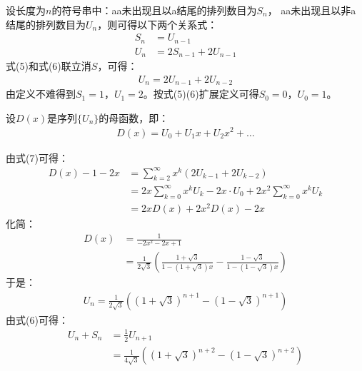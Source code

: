 \begin{solution}
    设长度为$n$的符号串中：aa未出现且以a结尾的排列数目为$S_n$，
    aa未出现且以非a结尾的排列数目为$U_n$，则可得以下两个关系式：
    \begin{align}
        S_n &= U_{n-1}\\
        U_n &= 2S_{n-1} + 2U_{n-1}
    \end{align}
    式(5)和式(6)联立消$S$，可得：
    \begin{align}
        U_{n}=2U_{n-1}+2U_{n-2}
    \end{align}
    由定义不难得到$S_1=1$，$U_1=2$。按式(5)(6)扩展定义可得$S_0=0$，$U_0=1$。

    设$D(x)$是序列$\{U_n\}$的母函数，即：
    \begin{align*}
        D(x)=U_0+U_1x+U_2x^2+\ldots
    \end{align*}

    由式(7)可得：
    \begin{align*}
        D(x) - 1 - 2x &= \sum_{k=2}^\infty x^k(2U_{k-1}+2U_{k-2})\\
        &= 2x\sum_{k=0}^\infty x^kU_{k} - 2x\cdot U_0 + 2x^2\sum_{k=0}^\infty x^kU_{k}\\
        &= 2xD(x) + 2x^2D(x) - 2x
    \end{align*}
    化简：
    \begin{align*}
        D(x) &= \frac{1}{-2x^2-2x+1}\\
        &= \frac{1}{2\sqrt{3}}\left(\frac{1+\sqrt{3}}{1-(1+\sqrt{3})x}-\frac{1-\sqrt{3}}{1-(1-\sqrt{3})x}\right)
    \end{align*}
    于是：
    \begin{align*}
        U_n = \frac{1}{2\sqrt{3}}\left((1+\sqrt{3})^{n+1}-(1-\sqrt{3})^{n+1}\right)
    \end{align*}
    由式(6)可得：
    \begin{align*}
        U_n + S_n&= \frac{1}{2}U_{n+1}\\
        &= \frac{1}{4\sqrt{3}}\left((1+\sqrt{3})^{n+2}-(1-\sqrt{3})^{n+2}\right)
    \end{align*}
\end{solution}